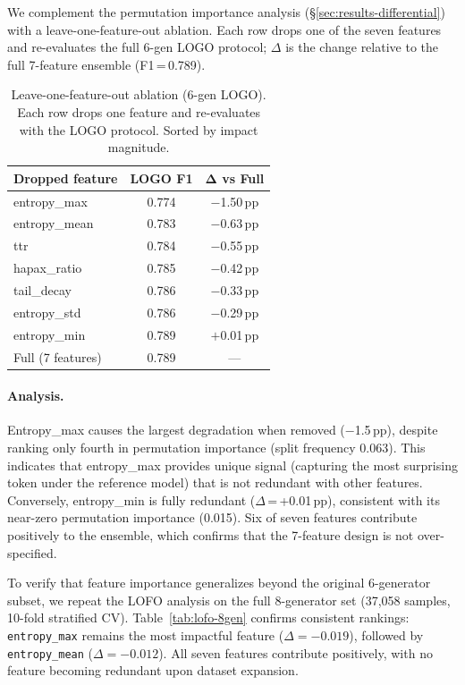  We complement the permutation importance analysis (\S\ref{sec:results-differential}) with a leave-one-feature-out ablation. Each row drops one of the seven features and re-evaluates the full 6-gen LOGO protocol; $\Delta$ is the change relative to the full 7-feature ensemble (F1\,=\,0.789).

\begin{table}[ht]
\centering
\small
\caption{Leave-one-feature-out ablation (6-gen LOGO). Each row drops one feature and re-evaluates with the LOGO protocol. Sorted by impact magnitude.}
\label{tab:lofo}
\begin{tabular}{lcc}
\toprule
\textbf{Dropped feature} & \textbf{LOGO F1} & $\boldsymbol{\Delta}$ \textbf{vs Full} \\
\midrule
entropy\_max    & 0.774 & $-$1.50\,pp \\
entropy\_mean   & 0.783 & $-$0.63\,pp \\
ttr             & 0.784 & $-$0.55\,pp \\
hapax\_ratio    & 0.785 & $-$0.42\,pp \\
tail\_decay     & 0.786 & $-$0.33\,pp \\
entropy\_std    & 0.786 & $-$0.29\,pp \\
entropy\_min    & 0.789 & $+$0.01\,pp \\
\midrule
Full (7 features) & 0.789 & --- \\
\bottomrule
\end{tabular}
\end{table}

\paragraph{Analysis.}
 Entropy\_max causes the largest degradation when removed ($-$1.5\,pp), despite ranking only fourth in permutation importance (split frequency 0.063). This indicates that entropy\_max provides unique signal (capturing the most surprising token under the reference model) that is not redundant with other features.
Conversely, entropy\_min is fully redundant ($\Delta$\,=\,+0.01\,pp), consistent with its near-zero permutation importance (0.015).
Six of seven features contribute positively to the ensemble, which confirms that the 7-feature design is not over-specified.

 To verify that feature importance generalizes beyond the original 6-generator subset, we repeat the LOFO analysis on the full 8-generator set (37,058 samples, 10-fold stratified CV). Table~\ref{tab:lofo-8gen} confirms consistent rankings: \texttt{entropy\_max} remains the most impactful feature ($\Delta=-0.019$), followed by \texttt{entropy\_mean} ($\Delta=-0.012$). All seven features contribute positively, with no feature becoming redundant upon dataset expansion.

